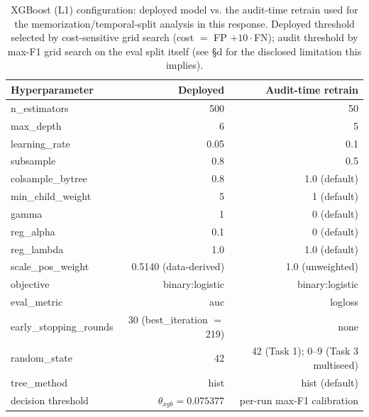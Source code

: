 
\begin{table}[t]
\centering
\caption{XGBoost (L1) configuration: deployed model vs. the audit-time
retrain used for the memorization/temporal-split analysis in this
response. Deployed threshold selected by cost-sensitive grid search
(cost $=$ FP $+10\cdot$FN); audit threshold by max-F1 grid search on the
eval split itself (see \S d for the disclosed limitation this implies).}
\label{tab:xgb-config}
\begin{tabular}{lrr}
\toprule
Hyperparameter & Deployed & Audit-time retrain \\
\midrule
n\_estimators & 500 & 50 \\
max\_depth & 6 & 5 \\
learning\_rate & 0.05 & 0.1 \\
subsample & 0.8 & 0.5 \\
colsample\_bytree & 0.8 & 1.0 (default) \\
min\_child\_weight & 5 & 1 (default) \\
gamma & 1 & 0 (default) \\
reg\_alpha & 0.1 & 0 (default) \\
reg\_lambda & 1.0 & 1.0 (default) \\
scale\_pos\_weight & 0.5140 (data-derived) & 1.0 (unweighted) \\
objective & binary:logistic & binary:logistic \\
eval\_metric & auc & logloss \\
early\_stopping\_rounds & 30 (best\_iteration $=$ 219) & none \\
random\_state & 42 & 42 (Task 1); 0--9 (Task 3 multiseed) \\
tree\_method & hist & hist (default) \\
decision threshold & $\theta_{xgb}=0.075377$ & per-run max-F1 calibration \\
\bottomrule
\end{tabular}
\end{table}

